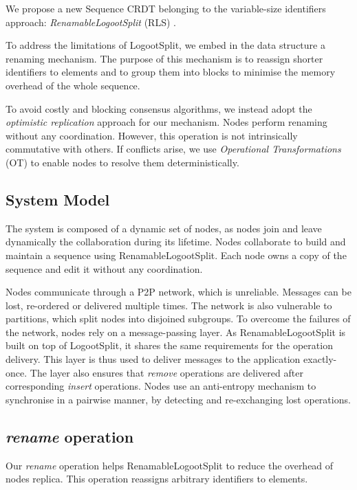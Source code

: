 \documentclass[sigplan,10pt,authorversion]{acmart}
\begin{document}
We propose a new Sequence \ac{CRDT} belonging to the variable-size identifiers approach: \emph{RenamableLogootSplit} (RLS) \cite{nicolas:hal-01932552}.

To address the limitations of LogootSplit, we embed in the data structure a renaming mechanism.
The purpose of this mechanism is to reassign shorter identifiers to elements and to group them into blocks to minimise the memory overhead of the whole sequence.

To avoid costly and blocking consensus algorithms, we instead adopt the \emph{optimistic replication} \cite{10.1145/1057977.1057980} approach for our mechanism.
Nodes perform renaming without any coordination.
However, this operation is not intrinsically commutative with others.
If conflicts arise, we use \emph{Operational Transformations} (OT) \cite{10.1145/289444.289469,4668339} to enable nodes to resolve them deterministically.

\subsection{System Model}

The system is composed of a dynamic set of nodes, as nodes join and leave dynamically the collaboration during its lifetime.
Nodes collaborate to build and maintain a sequence using RenamableLogootSplit.
Each node owns a copy of the sequence and edit it without any coordination.

Nodes communicate through a \ac{P2P} network, which is unreliable.
Messages can be lost, re-ordered or delivered multiple times.
The network is also vulnerable to partitions, which split nodes into disjoined subgroups.
To overcome the failures of the network, nodes rely on a message-passing layer.
As RenamableLogootSplit is built on top of LogootSplit, it shares the same requirements for the operation delivery.
This layer is thus used to deliver messages to the application exactly-once.
The layer also ensures that \emph{remove} operations are delivered after corresponding \emph{insert} operations.
Nodes use an anti-entropy mechanism to synchronise in a pairwise manner, by detecting and re-exchanging lost operations.

\subsection{\emph{rename} operation}

\label{sec:rename-op}

Our \emph{rename} operation helps RenamableLogootSplit to reduce the overhead of nodes replica.
This operation reassigns arbitrary identifiers to elements.
\end{document}
